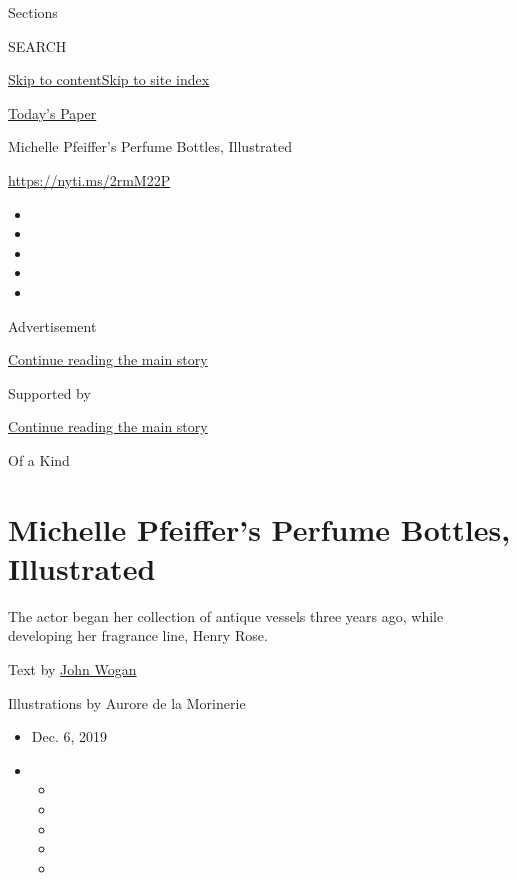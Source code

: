 Sections

SEARCH

\protect\hyperlink{site-content}{Skip to
content}\protect\hyperlink{site-index}{Skip to site index}

\href{https://myaccount.nytimes3xbfgragh.onion/auth/login?response_type=cookie\&client_id=vi}{}

\href{https://www.nytimes3xbfgragh.onion/section/todayspaper}{Today's
Paper}

Michelle Pfeiffer's Perfume Bottles, Illustrated

\url{https://nyti.ms/2rmM22P}

\begin{itemize}
\item
\item
\item
\item
\item
\end{itemize}

Advertisement

\protect\hyperlink{after-top}{Continue reading the main story}

Supported by

\protect\hyperlink{after-sponsor}{Continue reading the main story}

Of a Kind

\hypertarget{michelle-pfeiffers-perfume-bottles-illustrated}{%
\section{Michelle Pfeiffer's Perfume Bottles,
Illustrated}\label{michelle-pfeiffers-perfume-bottles-illustrated}}

The actor began her collection of antique vessels three years ago, while
developing her fragrance line, Henry Rose.

Text by \href{https://www.nytimes3xbfgragh.onion/by/john-wogan}{John
Wogan}

Illustrations by Aurore de la Morinerie

\begin{itemize}
\item
  Dec. 6, 2019
\item
  \begin{itemize}
  \item
  \item
  \item
  \item
  \item
  \end{itemize}
\end{itemize}

